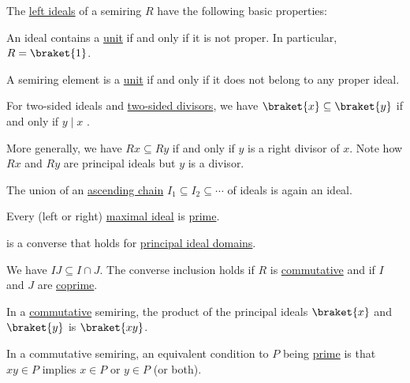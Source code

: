 \begin{proposition}\label{thm:def:semiring_ideal}
  The \hyperref[def:semiring_ideal]{left ideals} of a semiring \( R \) have the following basic properties:
  \begin{thmenum}
     An ideal contains a \hyperref[def:divisibility/unit]{unit} if and only if it is not proper. In particular, \( R = \braket{ 1 } \).

     A semiring element is a \hyperref[def:divisibility/unit]{unit} if and only if it does not belong to any proper ideal.

     For two-sided ideals and \hyperref[def:divisibility]{two-sided divisors}, we have \( \braket{ x } \subseteq \braket{ y } \) if and only if \( y \mid x \) .

    More generally, we have \( Rx \subseteq Ry \) if and only if \( y \) is a right divisor of \( x \). Note how \( Rx \) and \( Ry \) are  principal ideals but \( y \) is a  divisor.

     The union of an \hyperref[def:stabilizing_chain]{ascending chain} \( I_1 \subseteq I_2 \subseteq \cdots \) of ideals is again an ideal.

     Every (left or right) \hyperref[def:semiring_ideal/maximal]{maximal ideal} is \hyperref[def:semiring_ideal/prime]{prime}.

     is a converse that holds for \hyperref[def:principal_ideal_domain]{principal ideal domains}.

     We have \( IJ \subseteq I \cap J \). The converse inclusion holds if \( R \) is \hyperref[def:semiring/commutative]{commutative} and if \( I \) and \( J \) are \hyperref[def:semiring_ideal/coprime]{coprime}.

     In a \hyperref[def:semiring/commutative]{commutative} semiring, the product of the principal ideals \( \braket{x} \) and \( \braket{y} \) is \( \braket{xy} \).

     In a commutative semiring, an equivalent condition to \( P \) being \hyperref[def:semiring_ideal/prime]{prime} is that \( xy \in P \) implies \( x \in P \) or \( y \in P \) (or both).
  \end{thmenum}
\end{proposition}
